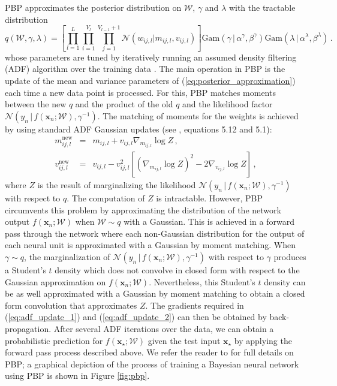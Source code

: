 PBP approximates the posterior distribution on $\mathcal{W}$, $\gamma$ and $\lambda$ with the tractable distribution
\begin{equation}
q(\mathcal{W},\gamma, \lambda) = \left[ \prod_{l=1}^L\! \prod_{i=1}^{V_l}\! 
\prod_{j=1}^{V_{l\!-\!1}\!+\!1} \mathcal{N}(w_{ij,l}| m_{ij,l},v_{ij,l})\right ]
 \text{Gam}(\gamma \,|\, \alpha^\gamma, \beta^\gamma)
\text{Gam}(\lambda \,|\, \alpha^\lambda, \beta^\lambda)\,.\label{eq:posterior_approximation}
\end{equation}
whose parameters are tuned by iteratively running an assumed density filtering (ADF) algorithm over the training data \cite{Opper}. The main operation in PBP is the update of the mean and variance parameters of (\ref{eq:posterior_approximation})
each time a new data point is processed.
For this, PBP matches moments between
the new $q$ and the product of the old $q$ and the likelihood factor $\mathcal{N}(y_n \,|\, f(\mathbf{x}_n;\mathcal{W}),\gamma^{-1})$. The matching of moments for the weights is achieved by using standard ADF Gaussian updates (see \cite{minka2001family}, equations 5.12 and 5.1):
\begin{eqnarray}
\label{eq:adf_update_1} m_{ij,l}^\text{new} & = & m_{ij,l} + v_{ij,l} \nabla_{m_{ij,l}} \log Z \,,\\
\label{eq:adf_update_2}v_{ij,l}^\text{new} & = & v_{ij,l} - v_{ij,l}^2 \left[ (\nabla_{m_{ij,l}} \log Z)^2 - 2 \nabla_{v_{ij,l}} \log Z \right]\,,
\end{eqnarray}
where $Z$ is the result of marginalizing the likelihood $\mathcal{N}(y_n\,|\, f(\mathbf{x}_n;\mathcal{W}),\gamma^{-1})$ with
respect to $q$. The computation of $Z$ is intractable. However, PBP circumvents this problem by
approximating the distribution of the network output $f(\mathbf{x}_n;\mathcal{W})$ when $\mathcal{W} \sim q$ with a Gaussian.
This is achieved in a forward pass through the network where each non-Gaussian distribution for the output of each neural unit is approximated with a Gaussian by moment matching. When $\gamma\sim q$, the marginalization of $\mathcal{N}(y_n \,|\, f(\mathbf{x}_n;\mathcal{W}),\gamma^{-1})$  with respect to $\gamma$ produces a Student's $t$ density which does not convolve in closed form with respect to the Gaussian approximation on $f(\mathbf{x}_n;\mathcal{W})$. Nevertheless, this Student's $t$ density can be as well approximated with a Gaussian by moment matching to obtain a closed form convolution that approximates $Z$.
The gradients required in (\ref{eq:adf_update_1}) and (\ref{eq:adf_update_2}) can then be obtained by back-propagation.
After several ADF iterations over the data, we can obtain a probabilistic prediction for $f(\mathbf{x}_\star;\mathcal{W})$ given the test input $\mathbf{x}_\star$ by applying the forward pass process described above. We refer the reader to \cite{hernandez2015probabilistic} for full details on PBP; a graphical depiction of the process of training a Bayesian neural network using PBP is shown in Figure \ref{fig:pbp}.

